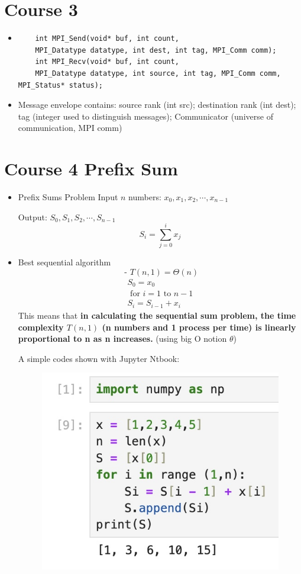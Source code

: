 \documentclass{article}
\begin{document}
\section{Course 3 }
\begin{itemize}
    \item \begin{verbatim}
    int MPI_Send(void* buf, int count,
    MPI_Datatype datatype, int dest, int tag, MPI_Comm comm);
    int MPI_Recv(void* buf, int count,
    MPI_Datatype datatype, int source, int tag, MPI_Comm comm, MPI_Status* status);
    \end{verbatim}
    \item Message envelope contains: source rank (int src); destination rank (int dest); tag (integer used to distinguish messages); Communicator (universe of communication, MPI comm)
\end{itemize}
\section{Course 4 Prefix Sum}
\begin{itemize}
    \item Prefix Sums Problem
Input $n$ numbers: $x_0, x_1, x_2, \cdots, x_{n-1}$

Output: $S_0, S_1, S_2, \cdots, S_{n-1}$
$$
S_i=\sum_{j=0}^i x_j
$$
\item Best sequential algorithm
$$
\text { - } T(n, 1)=\Theta(n)
$$
$$
\begin{array}{|l}
S_0=x_0 \\
\text { for } i=1 \text { to } n-1 \\
S_i=S_{i-1}+x_i
\end{array}
$$
This means that \textbf{in calculating the sequential sum problem, the time complexity $T(n,1)$ (n numbers and 1 process per time) is linearly proportional to n as n increases.} (using big O notion $\theta$)\par
A simple codes shown with Jupyter Ntbook:
\begin{figure}[H]
    \centering
    \includegraphics[width=0.5\linewidth]{Image 1-31-24 at 10.38.jpeg}
    
    
\end{figure}
\end{itemize}
\end{document}
